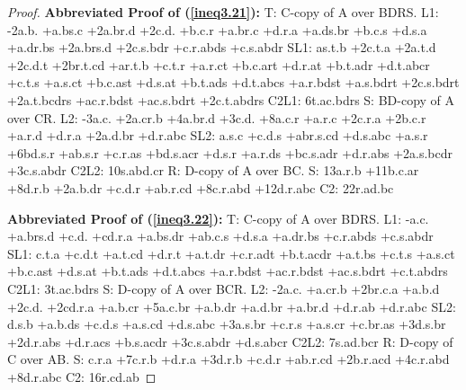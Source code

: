 \documentclass[10pt,journal]{IEEEtran}
\begin{document}
\begin{proof}
{\bf Abbreviated Proof of (\ref{ineq3.21}):}
T: C-copy of A over BDRS.\newline
L1: -2a.b. +a.bs.c +2a.br.d +2c.d. +b.c.r +a.br.c +d.r.a +a.ds.br +b.c.s +d.s.a +a.dr.bs +2a.brs.d +2c.s.bdr +c.r.abds +c.s.abdr\newline
SL1: as.t.b +2c.t.a +2a.t.d +2c.d.t +2br.t.cd +ar.t.b +c.t.r +a.r.ct +b.c.art +d.r.at +b.t.adr +d.t.abcr +c.t.s +a.s.ct +b.c.ast +d.s.at +b.t.ads +d.t.abcs +a.r.bdst +a.s.bdrt +2c.s.bdrt +2a.t.bcdrs +ac.r.bdst +ac.s.bdrt +2c.t.abdrs
C2L1: 6t.ac.bdrs\newline
S: BD-copy of A over CR.\newline
L2: -3a.c. +2a.cr.b +4a.br.d +3c.d. +8a.c.r +a.r.c +2c.r.a +2b.c.r +a.r.d +d.r.a +2a.d.br +d.r.abc\newline
SL2: a.s.c +c.d.s +abr.s.cd +d.s.abc +a.s.r +6bd.s.r +ab.s.r +c.r.as +bd.s.acr +d.s.r +a.r.ds +bc.s.adr +d.r.abs +2a.s.bcdr +3c.s.abdr\newline
C2L2: 10s.abd.cr\newline
R: D-copy of A over BC.\newline
S: 13a.r.b +11b.c.ar +8d.r.b +2a.b.dr +c.d.r +ab.r.cd +8c.r.abd +12d.r.abc\newline
C2: 22r.ad.bc\newline


{\bf Abbreviated Proof of (\ref{ineq3.22}):}
T: C-copy of A over BDRS.\newline
L1: -a.c. +a.brs.d +c.d. +cd.r.a +a.bs.dr +ab.c.s +d.s.a +a.dr.bs +c.r.abds +c.s.abdr\newline
SL1: c.t.a +c.d.t +a.t.cd +d.r.t +a.t.dr +c.r.adt +b.t.acdr +a.t.bs +c.t.s +a.s.ct +b.c.ast +d.s.at +b.t.ads +d.t.abcs +a.r.bdst +ac.r.bdst +ac.s.bdrt +c.t.abdrs
C2L1: 3t.ac.bdrs\newline
S: D-copy of A over BCR.\newline
L2: -2a.c. +a.cr.b +2br.c.a +a.b.d +2c.d. +2cd.r.a +a.b.cr +5a.c.br +a.b.dr +a.d.br +a.br.d +d.r.ab +d.r.abc\newline
SL2: d.s.b +a.b.ds +c.d.s +a.s.cd +d.s.abc +3a.s.br +c.r.s +a.s.cr +c.br.as +3d.s.br +2d.r.abs +d.r.acs +b.s.acdr +3c.s.abdr +d.s.abcr\newline
C2L2: 7s.ad.bcr\newline
R: D-copy of C over AB.\newline
S: c.r.a +7c.r.b +d.r.a +3d.r.b +c.d.r +ab.r.cd +2b.r.acd +4c.r.abd +8d.r.abc\newline
C2: 16r.cd.ab\newline



\end{proof}
\end{document}

